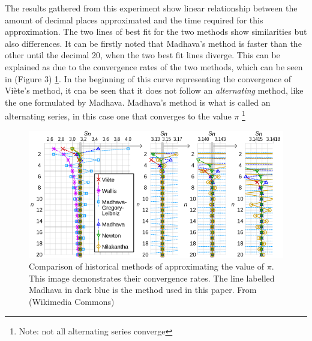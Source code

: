 The results gathered from this experiment show linear relationship between the amount of decimal 
places approximated and the time required for this approximation. The two lines of best fit for 
the two methods show similarities but also differences. It can be firstly noted that Madhava's 
method is faster than the other until the decimal 20, when the two best fit lines diverge. This 
can be explained as due to the convergence rates of the two methods, which can be seen in (Figure 3) 
\ref{fig:comparaison}. In the beginning of this curve representing the convergence of Viète's method, 
it cna be seen that it does not follow an \textit{alternating} method, like the one formulated by 
Madhava. Madhava's method is what is called an alternating series, in this case one that converges 
to the value $\pi$ \footnote{Note: not all alternating series converge}



\begin{figure}
    \includegraphics[width=\linewidth]{image.png}
    \caption{Comparison of historical methods of approximating the value of $\pi$. This image demonstrates
    their convergence rates. The line labelled Madhava in dark blue is the method used in this paper. 
    From (Wikimedia Commons) \cite{infinite_series_comparaison}}
    \label{fig:comparaison}
  \end{figure}
